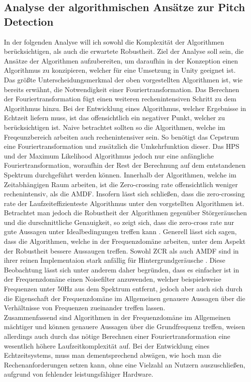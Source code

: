 \subsection{Analyse der algorithmischen Ansätze zur Pitch Detection}
\label{sec:analyse_echtzeit}
In der folgenden Analyse will ich sowohl die Komplexität der Algorithmen berücksichtigen, als auch die erwartete Robustheit. Ziel der Analyse soll sein, die Ansätze der Algorithmen aufzubereiten, um daraufhin in der Konzeption einen Algorithmus zu konzipieren, welcher für eine Umsetzung in Unity geeignet ist. \\
Das größte Unterscheidungsmerkmal der oben vorgestellten Algorithmen ist, wie bereits erwähnt, die Notwendigkeit einer Fouriertransformation. Das Berechnen der Fouriertransformation fügt einen weiteren rechenintensiven Schritt zu dem Algorithmus hinzu. Bei der Entwicklung eines Algorithmus, welcher Ergebnisse in Echtzeit liefern muss, ist das offensichtlich ein negativer Punkt, welcher zu berücksichtigen ist. Naive betrachtet sollten so die Algorithmen, welche im Freqeunzbereich arbeiten auch rechenintensiver sein. So benötigt das Cepstrum eine Fouriertransformation und zusätzlich die Umkehrfunktion dieser. Das HPS und der Maximum Likelihood Algorithmus jedoch nur eine anfängliche Fouriertransformation, woraufhin der Rest der Berechnung auf dem entstandenen Spektrum durchgeführt werden können. Innerhalb der Algorithmen, welche im Zeitabhängigen Raum arbeiten, ist die Zero-crossing rate offensichtlich weniger rechenintensiv, als die AMDF. Insofern lässt sich schließen, dass die zero-crossing rate der Laufzeiteffizienteste Algorithmus unter den vorgstellten Algorithmen ist. Betrachtet man jedoch die Robustheit der Algorithmen gegenüber Störgeräuschen und die durschnittliche Genauigkeit, so zeigt sich, dass die zero-cross rate nur gute Aussagen unter Idealbedingungen treffen kann \cite{amado2008pitch}. Generell lässt sich sagen, dass die Algorithmen, welche in der Frequenzdomäne arbeiten, unter dem Aspekt der Robustheit bessere Aussaugen treffen. Sowohl ZCR als auch AMDF sind in ihrer reinen Implementaion stark anfällig für Hintergrundgeräusche \cite{cuadra2001hps}. Diese Beobachtung lässt sich unter anderem daher begründen, dass es einfacher ist in der Frequenzdomäne einen Noisefilter anzuwenden, welcher beispielsweise Frequenzen unter 50Hz aus dem Spektrum entfernt, jedoch aber auch sich durch die Eigenschaft der Frequenzdomäne im Allgemeinen genauere Aussagen über die Verhältnisse von Frequenzen zueinander treffen lassen. \\
Zusammenfassend sind Algorithmen in der Frequenzdomäne im Allgemeinen mächtiger und können genauere Aussagen über die Grundfrequenz treffen, weisen allerdings auch durch das nötige Berechnen einer Fouriertransformation eine wesentlich höhere Laufzeitkomplexität auf. Bei der Entwicklung eines Echtzeitsystems, muss man dementsprechend abwägen, wie hoch man die Rechenanforderungen setzen kann, ohne eine Vielzahl an Nutzern auszuschließen, aufgrund von fehlender leistungsfähiger Hardware. 

